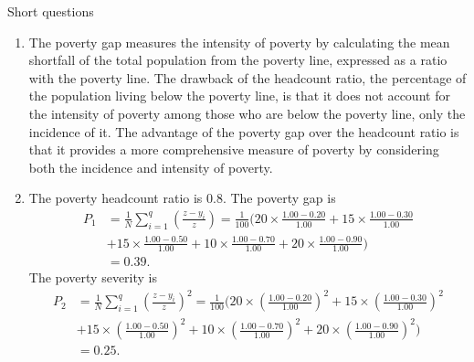 \begin{homeworkProblem}{Short questions}
\begin{solution}
        \begin{enumerate}
            \item The poverty gap measures the intensity of poverty by 
                calculating the mean shortfall of the total population from 
                the poverty line, expressed as a ratio with the poverty line. 
                The drawback of the headcount ratio, the percentage of the 
                population living below the poverty line, is that it does not 
                account for the intensity of poverty among those who are below 
                the poverty line, only the incidence of it. The advantage of 
                the poverty gap over the headcount ratio is that it provides 
                a more comprehensive measure of poverty by considering both 
                the incidence and intensity of poverty.
            \item The poverty headcount ratio is 0.8. The poverty gap is 
                \[
                    \begin{aligned}
                        P_1 &= \frac{1}{N} \sum_{i=1}^{q} \left( 
                            \frac{z - y_i}{z} \right) = \frac{1}{100} \Bigg(
                            20 \times \frac{1.00 - 0.20}{1.00} + 15 \times 
                            \frac{1.00 - 0.30}{1.00} \\
                            &+ 15 \times \frac{1.00 - 0.50}{1.00} + 10 \times 
                            \frac{1.00 - 0.70}{1.00} + 20 
                            \times \frac{1.00 - 0.90}{1.00} \Bigg) \\
                            &= 0.39.
                    \end{aligned}
                \]
                The poverty severity is 
                \[
                    \begin{aligned}
                        P_2 &= \frac{1}{N} \sum_{i=1}^{q} \left( 
                            \frac{z - y_i}{z} \right)^2 = \frac{1}{100} \Bigg(
                            20 \times \left( \frac{1.00 - 0.20}{1.00} \right)^2
                            + 15 \times \left( \frac{1.00 - 0.30}{1.00} \right)^2 \\
                            &+ 15 \times \left( \frac{1.00 - 0.50}{1.00} \right)^2
                            + 10 \times \left( \frac{1.00 - 0.70}{1.00} \right)^2
                            + 20 \times \left( \frac{1.00 - 0.90}{1.00} \right)^2
                        \Bigg) \\
                        &= 0.25.

\end{aligned}\]
\end{enumerate}
\end{solution}
\end{homeworkProblem}
